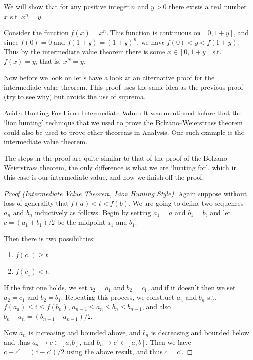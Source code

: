 \begin{example}
	We will show that for any positive integer $n$ and $y > 0$ there exists a real number $x$ s.t. $x^n = y$.

	Consider the function $f(x) = x^n$. This function is continuous on $[0, 1 + y]$, and since $f(0) = 0$ and $f(1 + y) = (1 + y)^n$, we have $f(0) < y < f(1 + y)$.
	Thus by the intermediate value theorem there is some $x \in [0, 1+ y]$ s.t. $f(x) = y$, that is, $x^N = y$.
\end{example}

Now before we look on let's have a look at an alternative proof for the intermediate value theorem. This proof uses the same idea as the previous proof (try to see why) but avoids the use of suprema.

\begin{aside}{Aside: Hunting For \st{Lions} Intermediate Values}
	It was mentioned before that the `lion hunting' technique that we used to prove the Bolzano–Weierstrass theorem could also be used to prove other theorems in Analysis. One such example is the intermediate value theorem.

	The steps in the proof are quite similar to that of the proof of the Bolzano-Weierstrass theorem, the only difference is what we are `hunting for', which in this case is our intermediate value, and how we finish off the proof.

	\begin{proof}[Proof (Intermediate Value Theorem, Lion Hunting Style)]
Again suppose without loss of generality that $f(a) < t < f(b)$.
We are going to define two sequences $a_n$ and $b_n$ inductively as follows. Begin by setting $a_1 = a$ and $b_1=b$, and let $c = (a_1 + b_1)/2$ be the midpoint $a_1$ and $b_1$.

Then there is two possibilities:
\begin{enumerate}
\item $f(c_1) \geq t$.
\item $f(c_1) < t$.
\end{enumerate}
If the first one holds, we set $a_2 = a_1$ and $b_2 = c_1$, and if it doesn't then we set $a_2 = c_1$ and $b_2 = b_1$.
Repeating this process, we construct $a_n$ and $b_n$ s.t. $f(a_n) \leq t \leq f(b_n)$, $a_{n - 1} \leq a_n \leq b_n \leq b_{n - 1}$, and also $b_n - a_n = (b_{n - 1} - a_{n - 1})/2$.

Now $a_n$ is increasing and bounded above, and $b_n$ is decreasing and bounded below and thus $a_n \rightarrow c \in [a, b]$, and $b_n \rightarrow c' \in [a, b]$. Then we have $c - c' = (c - c')/2$ using the above result, and thus $c = c'$.


\end{proof}
\end{aside}
